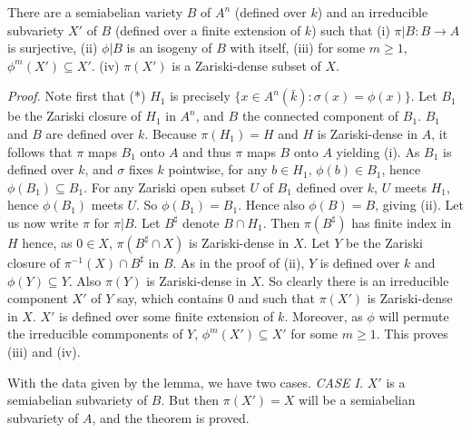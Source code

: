 \begin{Lemma} There are a semiabelian variety
$B$ of $A^{n}$ (defined over $k$) and an
irreducible subvariety $X'$ of $B$ (defined
over a finite extension of $k$) such that
\newline
(i) $\pi|B:B\rightarrow A$ is surjective,
\newline
(ii) $\phi|B$ is an isogeny of $B$ with itself,
\newline
(iii) for some $m\geq 1$,
$\phi^{m}(X')\subseteq X'$.
\newline
(iv)  $\pi(X')$ is a Zariski-dense subset of
$X$.
\end{Lemma}
{\em Proof.} Note first that
\newline
(*) $H_{1}$ is
precisely $\{x\in A^{n}({\bar k}): \sigma(x)
= \phi(x)\}$.
\newline
Let
$B_{1}$ be the
Zariski closure of
$H_{1}$ in
$A^{n}$, and $B$ the connected component of
$B_{1}$. $B_{1}$ and $B$ are defined over
$k$. Because
$\pi(H_{1}) = H$ and $H$ is Zariski-dense in
$A$, it follows that $\pi$ maps $B_{1}$ onto
$A$ and thus $\pi$ maps $B$ onto $A$ yielding
(i).
\newline
As $B_{1}$ is defined over $k$, and $\sigma$
fixes $k$ pointwise, for any $b\in H_{1}$,
$\phi(b)\in B_{1}$, hence
$\phi(B_{1})\subseteq B_{1}$. For any Zariski
open subset $U$ of $B_{1}$ defined over $k$,
$U$ meets $H_{1}$, hence $\phi(B_{1})$ meets
$U$. So $\phi(B_{1}) = B_{1}$. Hence also
$\phi(B) = B$, giving (ii).
\newline
Let us now write $\pi$ for $\pi|B$. Let
$B^{\sharp}$ denote $B\cap H_{1}$. Then
$\pi(B^{\sharp})$ has finite index in $H$
hence, as $0\in X$, $\pi(B^{\sharp}\cap X)$ is
Zariski-dense in $X$. Let $Y$ be the Zariski
closure of $\pi^{-1}(X)\cap B^{\sharp}$ in
$B$. As in the proof of (ii), $Y$ is defined
over $k$ and $\phi(Y)\subseteq Y$. Also
$\pi(Y)$ is Zariski-dense in $X$. So clearly
there is an irreducible component $X'$ of $Y$
say, which contains $0$ and such that
$\pi(X')$ is Zariski-dense in $X$. $X'$ is
defined over some finite extension of $k$.
Moreover, as $\phi$ will permute the
irreducible commponents of $Y$,
$\phi^{m}(X')\subseteq X'$ for some $m\geq 1$.
This proves (iii) and (iv).

\vspace{5mm}
\noindent
With the data given by the lemma, we have two
cases.
\newline
{\em CASE I.} $X'$ is a
semiabelian subvariety of $B$.
\newline
But then $\pi(X') = X$ will be a semiabelian
subvariety of $A$, and the theorem is proved.

